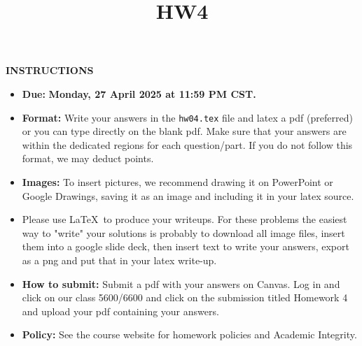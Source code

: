 \documentclass[twoside]{article}
\title{HW4}
\begin{document}
\thispagestyle{empty}


\maketitle 
\smallskip
\smallskip
\textbf{INSTRUCTIONS}

\begin{itemize}
\item \textbf{Due:} \textbf{Monday, 27 April 2025 at 11:59 PM CST.} 
\item \textbf{Format:} Write your answers in the \texttt{hw04.tex} file and latex a pdf (preferred) or you can type directly on the blank pdf. Make sure that your answers are within the dedicated regions for each question/part. If you do not follow this format, we may deduct points. 
\item \textbf{Images:} To insert pictures, we recommend drawing it on PowerPoint or Google Drawings, saving it as an image and including it in your latex source.

\item Please use \LaTeX\ to produce your writeups. For these problems the easiest way to "write" your solutions is probably to download all image files, insert them into a google slide deck, then insert text to write your answers, export as a png and put that in your latex write-up.

\item \textbf{How to submit:} Submit a pdf with your answers on Canvas. Log in and click on our class 5600/6600 and click on the submission titled Homework 4 and upload your pdf containing your answers. 
\item \textbf{Policy:} See the course website for homework policies and Academic Integrity.

\end{itemize}
\end{document}
